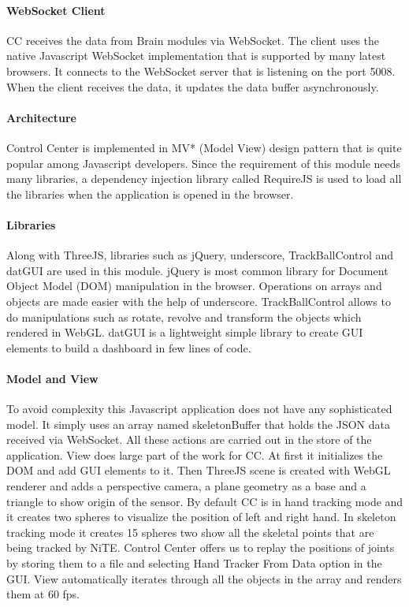 \paragraph*{WebSocket Client} CC receives the data from Brain modules via WebSocket. The client uses the native Javascript WebSocket implementation that is supported by many latest browsers. It connects to the WebSocket server that is listening on the port 5008. When the client receives the data, it updates the data buffer asynchronously.

\paragraph*{Architecture} Control Center is implemented in MV* (Model View) design pattern that is quite popular among Javascript developers. Since the requirement of this module needs many libraries, a dependency injection library called RequireJS is used to load all the libraries when the application is opened in the browser.  

\paragraph*{Libraries} Along with ThreeJS, libraries such as jQuery, underscore, TrackBallControl and datGUI are used in this module. jQuery is most common library for Document Object Model (DOM) manipulation in the browser. Operations on arrays and objects are made easier with the help of underscore. TrackBallControl allows to do manipulations such as rotate, revolve and transform the objects which rendered in WebGL. datGUI is a lightweight simple library to create GUI elements to build a dashboard in few lines of code.

\paragraph*{Model and View} To avoid complexity this Javascript application does not have any sophisticated model. It simply uses an array named skeletonBuffer that holds the JSON data received via WebSocket. All these actions are carried out in the store of the application. View does large part of the work for CC. At first it initializes the DOM and add GUI elements to it. Then ThreeJS scene is created with WebGL renderer and adds a perspective camera, a plane geometry as a base and a triangle to show origin of the sensor. By default CC is in hand tracking mode and it creates two spheres to visualize the position of left and right hand. In skeleton tracking mode it creates 15 spheres two show all the skeletal points that are being tracked by NiTE. Control Center offers us to replay the positions of joints by storing them to a file and selecting Hand Tracker From Data option in the GUI. View automatically iterates through all the objects in the array and renders them at 60 fps. 


